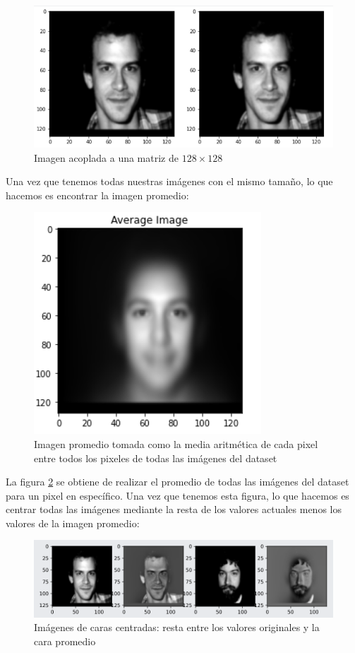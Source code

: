 \documentclass[conference]{IEEEtran}
\begin{document}
\begin{figure}[H]
    \centering
    \includegraphics[scale=0.2]{imgs/centered_images.png}
    \caption{Imagen acoplada a una matriz de $128\times 128$}
    \label{fig:faces_centered}
\end{figure}

Una vez que tenemos todas nuestras imágenes con el mismo tamaño, lo que hacemos es encontrar la imagen promedio:

\begin{figure}[H]
    \centering
    \includegraphics[scale=0.25]{imgs/avg_img.png}
    \caption{Imagen promedio tomada como la media aritmética de cada pixel entre todos los pixeles de todas las imágenes del dataset}
    \label{fig:avg_face}
\end{figure}

La figura \ref{fig:avg_face} se obtiene de realizar el promedio de todas las imágenes del dataset para un pixel en específico. Una vez que tenemos esta figura, lo que hacemos es centrar todas las imágenes mediante la resta de los valores actuales menos los valores de la imagen promedio: 

\begin{figure}[H]
    \centering
    \includegraphics[scale=0.2]{imgs/centered_images_avg.png}
    \caption{Imágenes de caras centradas: resta entre los valores originales y la cara promedio}
    \label{fig:imgs_minus_avg}
\end{figure}
\end{document}
